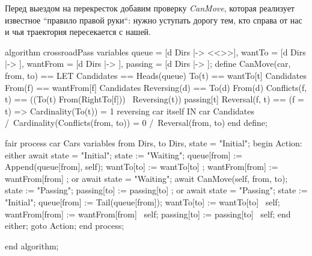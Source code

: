 \documentclass[14pt, openany]{report}
\begin{document}
Перед выездом на перекресток добавим проверку \emph{CanMove}, которая реализует известное ``правило правой руки``: нужно уступать дорогу тем, кто справа от нас и чья траектория пересекается с нашей.

\begin{ppcal}
algorithm crossroadPass
variables
  queue = [d \in Dirs |-> <<>>],
  wantTo = [d \in Dirs |-> {}],
  wantFrom = [d \in Dirs |-> {}],
  passing = [d \in Dirs |-> {}];
define
  CanMove(car, from, to) == 
    LET
      Candidates == Heads(queue)
      To(t) == wantTo[t] \intersect Candidates
      From(f) == wantFrom[f] \intersect Candidates
      Reversing(d) == To(d) \intersect From(d) 
      Conflicts(f, t) == ((To(t) \intersect From(RightTo[f])) \ Reversing(t)) \union passing[t]
      Reversal(f, t) == (f = t) => Cardinality(To(t)) = 1 \* reversing car itself
    IN
    car \in Candidates /\
    Cardinality(Conflicts(from, to)) = 0 /\
    Reversal(from, to)
end define;

fair process car \in Cars
variables
  from \in Dirs, to \in Dirs, state = "Initial";
begin
  Action:
    either
      await state = "Initial";
      state := "Waiting";
      queue[from] := Append(queue[from], self);
      wantTo[to] := wantTo[to] ;
      wantFrom[from] := wantFrom[from] ;
    or
      await state = "Waiting";
      await CanMove(self, from, to);
      state := "Passing";
      passing[to] := passing[to] ;
    or
      await state = "Passing";
      state := "Initial";
      queue[from] := Tail(queue[from]);
      wantTo[to] := wantTo[to] \ {self};
      wantFrom[from] := wantFrom[from] \ {self};
      passing[to] := passing[to] \ {self};
    end either;
    goto Action;
end process;

end algorithm;
\end{ppcal}
\end{document}
